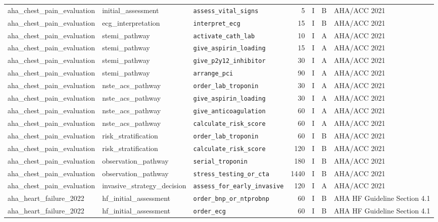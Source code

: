 \begin{longtable}{lllrrll}
aha\_chest\_pain\_evaluation & initial\_assessment & \texttt{assess\_vital\_signs} & 5 & I & B & AHA/ACC 2021 \\
aha\_chest\_pain\_evaluation & ecg\_interpretation & \texttt{interpret\_ecg} & 15 & I & B & AHA/ACC 2021 \\
aha\_chest\_pain\_evaluation & stemi\_pathway & \texttt{activate\_cath\_lab} & 10 & I & A & AHA/ACC 2021 \\
aha\_chest\_pain\_evaluation & stemi\_pathway & \texttt{give\_aspirin\_loading} & 15 & I & A & AHA/ACC 2021 \\
aha\_chest\_pain\_evaluation & stemi\_pathway & \texttt{give\_p2y12\_inhibitor} & 30 & I & A & AHA/ACC 2021 \\
aha\_chest\_pain\_evaluation & stemi\_pathway & \texttt{arrange\_pci} & 90 & I & A & AHA/ACC 2021 \\
aha\_chest\_pain\_evaluation & nste\_acs\_pathway & \texttt{order\_lab\_troponin} & 30 & I & A & AHA/ACC 2021 \\
aha\_chest\_pain\_evaluation & nste\_acs\_pathway & \texttt{give\_aspirin\_loading} & 30 & I & A & AHA/ACC 2021 \\
aha\_chest\_pain\_evaluation & nste\_acs\_pathway & \texttt{give\_anticoagulation} & 60 & I & A & AHA/ACC 2021 \\
aha\_chest\_pain\_evaluation & nste\_acs\_pathway & \texttt{calculate\_risk\_score} & 60 & I & A & AHA/ACC 2021 \\
aha\_chest\_pain\_evaluation & risk\_stratification & \texttt{order\_lab\_troponin} & 60 & I & B & AHA/ACC 2021 \\
aha\_chest\_pain\_evaluation & risk\_stratification & \texttt{calculate\_risk\_score} & 120 & I & B & AHA/ACC 2021 \\
aha\_chest\_pain\_evaluation & observation\_pathway & \texttt{serial\_troponin} & 180 & I & B & AHA/ACC 2021 \\
aha\_chest\_pain\_evaluation & observation\_pathway & \texttt{stress\_testing\_or\_cta} & 1440 & I & B & AHA/ACC 2021 \\
aha\_chest\_pain\_evaluation & invasive\_strategy\_decision & \texttt{assess\_for\_early\_invasive} & 120 & I & A & AHA/ACC 2021 \\
aha\_heart\_failure\_2022 & hf\_initial\_assessment & \texttt{order\_bnp\_or\_ntprobnp} & 60 & I & B & AHA HF Guideline Section 4.1 \\
aha\_heart\_failure\_2022 & hf\_initial\_assessment & \texttt{order\_ecg} & 60 & I & B & AHA HF Guideline Section 4.1 \\

\end{longtable}
